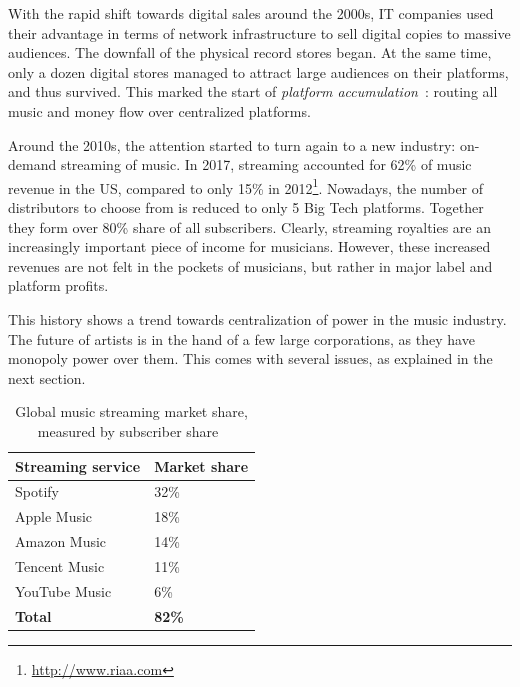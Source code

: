 With the rapid shift towards digital sales around the 2000s, IT companies used their advantage in terms of network infrastructure to sell digital copies to massive audiences. The downfall of the physical record stores began. At the same time, only a dozen digital stores managed to attract large audiences on their platforms, and thus survived. This marked the start of \textit{platform accumulation}~\citep{meier2019rising}: routing all music and money flow over centralized platforms.

Around the 2010s, the attention started to turn again to a new industry: on-demand streaming of music. In 2017, streaming accounted for 62\% of music revenue in the US, compared to only 15\% in 2012\footnote{\url{http://www.riaa.com}}. Nowadays, the number of distributors to choose from is reduced to only 5 Big Tech platforms. Together they form over 80\% share of all subscribers. Clearly, streaming royalties are an increasingly important piece of income for musicians. However, these increased revenues are not felt in the pockets of musicians, but rather in major label and platform profits.

This history shows a trend towards centralization of power in the music industry. The future of artists is in the hand of a few large corporations, as they have monopoly power over them. This comes with several issues, as explained in the next section. 


\begin{table}[]
\begin{tabular}{|l|l|}
\hline
\textbf{Streaming service} & \textbf{Market share} \\ \hline
Spotify                    & 32\%                  \\ \hline
Apple Music                & 18\%                  \\ \hline
Amazon Music               & 14\%                  \\ \hline
Tencent Music              & 11\%                  \\ \hline
YouTube Music              & 6\%                   \\ \hline
\textbf{Total}             & \textbf{82\%}         \\ \hline
\end{tabular}
\caption{Global music streaming market share, measured by subscriber share~\citep{midiamarketshare2020}}
\label{tab:streaming-service-market-share}
\end{table}

